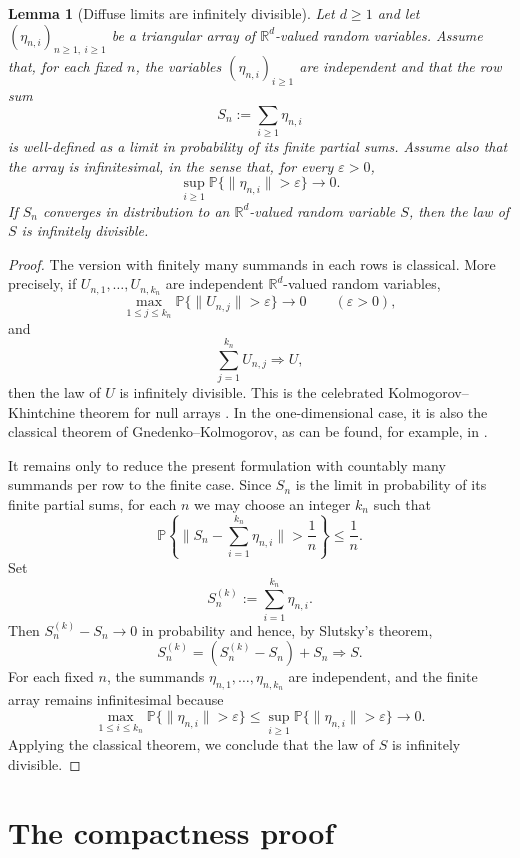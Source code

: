 \documentclass[11pt]{amsart}
\numberwithin{equation}{section}
\newtheorem{lemma}[theorem]{Lemma}
\theoremstyle{definition}
\theoremstyle{remark}
\newcommand{\Prob}{\mathbb P}
\newcommand{\R}{\mathbb R}
\newcommand{\eps}{\varepsilon}
\newcommand{\norm}[1]{\lVert #1 \rVert}
\begin{document}
\begin{lemma}[Diffuse limits are infinitely divisible]\label{lem:diffuse-id-limit}
Let $d\ge1$ and let $(\eta_{n,i})_{n\ge1,\ i\ge1}$ be a triangular array of
$\R^d$-valued random variables.  Assume that, for each fixed $n$, the variables
$(\eta_{n,i})_{i\ge1}$ are independent and that the row sum
\[
S_n:=\sum_{i\ge1} \eta_{n,i}
\]
is well-defined as a limit in probability of its finite partial sums.  Assume
also that the array is infinitesimal, in the sense that, for every
$\eps>0$,
\[
\sup_{i\ge1}\Prob\{\norm{\eta_{n,i}}>\eps\}\longrightarrow0.
\]
If $S_n$ converges in distribution to an $\R^d$-valued random variable $S$,
then the law of $S$ is infinitely divisible.
\end{lemma}
\begin{proof}
The version with finitely many summands in each rows is classical. More precisely, if 
$U_{n,1},\dots,U_{n,k_n}$ are independent $\R^d$-valued random variables,
\[
\max_{1\le j\le k_n}\Prob\{\norm{U_{n,j}}>\eps\}\longrightarrow0
\qquad(\eps>0),
\]
and
\[
\sum_{j=1}^{k_n}U_{n,j}\Rightarrow U,
\]
then the law of $U$ is infinitely divisible.  This is the celebrated
Kolmogorov--Khintchine theorem for null arrays
\cite[Theorem~9.3]{sato-levy}.  In the one-dimensional case, it is also the
classical theorem of Gnedenko--Kolmogorov, as can be found, for example,  in
\cite[Chapter~IV, Section~24]{gnedenko-kolmogorov}.

It remains only to reduce the present formulation with countably many summands per row to the
finite case.  Since $S_n$ is the limit in probability of its finite
partial sums, for each $n$ we may choose an integer $k_n$ such that
\[
\Prob\left\{
\norm{S_n-\sum_{i=1}^{k_n}\eta_{n,i}}>\frac1n
\right\}\le \frac1n.
\]
Set
\[
S_n^{(k)}:=\sum_{i=1}^{k_n}\eta_{n,i}.
\]
Then $S_n^{(k)}-S_n\to0$ in probability and  hence, by Slutsky's theorem,
\[
S_n^{(k)} = (S_n^{(k)}-S_n)+S_n\Rightarrow S.
\]
For each fixed $n$, the summands $\eta_{n,1},\dots,\eta_{n,k_n}$ are independent,
and the finite array remains infinitesimal because
\[
\max_{1\le i\le k_n}\Prob\{\norm{\eta_{n,i}}>\eps\}
\le
\sup_{i\ge1}\Prob\{\norm{\eta_{n,i}}>\eps\}
\longrightarrow0.
\]
Applying the classical theorem, we conclude that the law of $S$ is infinitely
divisible.
\end{proof}


\section{The compactness proof}\label{sec:compactness-proof}
\end{document}
